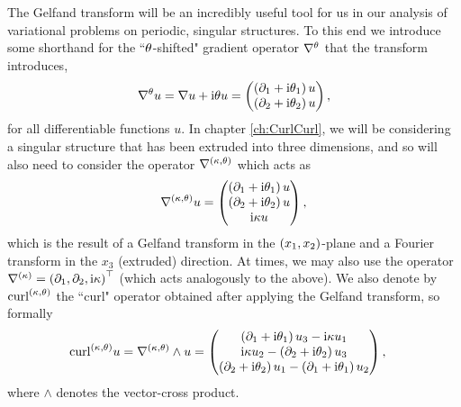 The Gelfand transform will be an incredibly useful tool for us in our analysis of variational problems on periodic, singular structures.
To this end we introduce some shorthand for the ``$\theta$-shifted" gradient operator $\nabla^{\theta}$ that the transform introduces,
\begin{align*}
	\nabla^{\theta} u = \nabla u + \mathrm{i}\theta u 
	= \begin{pmatrix} \left( \partial_1 + \mathrm{i}\theta_1 \right)u \\ \left( \partial_2 + \mathrm{i}\theta_2 \right)u \end{pmatrix},
\end{align*}
for all differentiable functions $u$.
In chapter \ref{ch:CurlCurl}, we will be considering a singular structure that has been extruded into three dimensions, and so will also need to consider the operator $\nabla^{\left( \kappa, \theta \right)}$ which acts as
\begin{align*}
	\nabla^{\left( \kappa, \theta \right)} u = 
	\begin{pmatrix} \left( \partial_1 + \mathrm{i}\theta_1 \right)u \\ \left( \partial_2 + \mathrm{i}\theta_2 \right)u \\ \mathrm{i}\kappa u \end{pmatrix},
\end{align*}
which is the result of a Gelfand transform in the $\left( x_1,x_2 \right)$-plane and a Fourier transform in the $x_3$ (extruded) direction.
At times, we may also use the operator $\nabla^{(\kappa)} = \left( \partial_1, \partial_2, \mathrm{i}\kappa \right)^\top$ (which acts analogously to the above).
We also denote by $\mathrm{curl}_{}^{\left( \kappa, \theta \right)}$ the ``curl" operator obtained after applying the Gelfand transform, so formally
\begin{align*}
	\mathrm{curl}_{}^{\left( \kappa, \theta \right)} u &= \nabla^{\left( \kappa, \theta \right)}\wedge u
	= 
	\begin{pmatrix}
		\left( \partial_1+\mathrm{i}\theta_1 \right) u_3 - \mathrm{i}\kappa u_1 \\
		\mathrm{i}\kappa u_2 - \left( \partial_2+\mathrm{i}\theta_2 \right) u_3 \\
		\left( \partial_2+\mathrm{i}\theta_2 \right) u_1 - \left( \partial_1+\mathrm{i}\theta_1 \right) u_2
	\end{pmatrix},
\end{align*}
where $\wedge$ denotes the vector-cross product.

